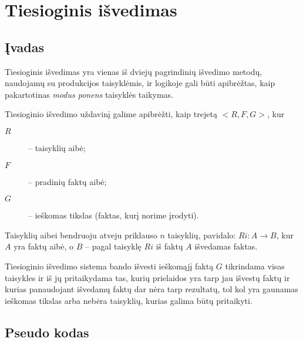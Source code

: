 \chapter{Tiesioginis išvedimas}

\section{Įvadas}

Tiesioginis išvedimas yra vienas iš dviejų pagrindinių išvedimo metodų,
naudojamų su produkcijos taisyklėmis, ir logikoje gali būti
apibrėžtas, kaip pakartotinas \emph{modus ponens} taisyklės
taikymas.

Tiesioginio išvedimo uždavinį galime apibrėžti, kaip trejetą
$<R, F, G>$, kur
\begin{description}
  \item[$R$] – taisyklių aibė;
  \item[$F$] – pradinių faktų aibė;
  \item[$G$] – ieškomas tikslas (faktas, kurį norime įrodyti).
\end{description}
Taisyklių aibei bendruoju atveju priklauso $n$ taisyklių, pavidalo:
$Ri: A \to B$, kur $A$ yra faktų aibė, o $B$ – pagal taisyklę
$Ri$ iš faktų $A$ išvedamas faktas.

Tiesioginio išvedimo sistema bando išvesti ieškomąjį faktą $G$
tikrindama visas taisykles ir iš jų pritaikydama tas, kurių
prielaidos yra tarp jau išvestų faktų ir kurias panaudojant išvedamų
faktų dar nėra tarp rezultatų, tol kol yra gaunamas ieškomas tikslas
arba nebėra taisyklių, kurias galima būtų pritaikyti.

\section{Pseudo kodas}

\label{sec:fc:pseudo}

